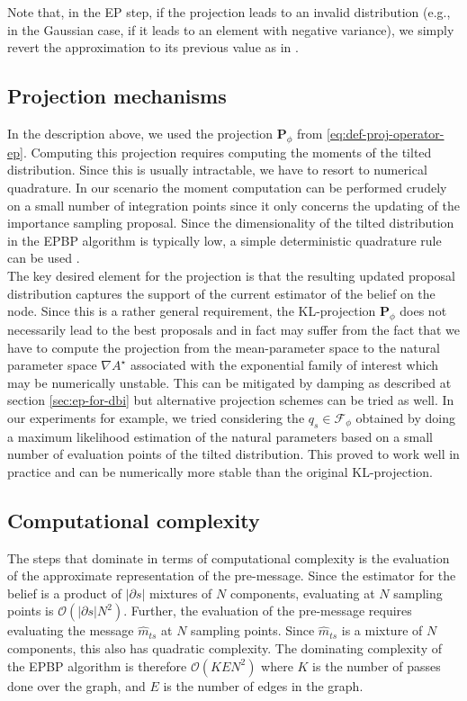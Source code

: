 Note that, in the EP step, if the projection leads to an invalid distribution (e.g., in the Gaussian case, if it leads to an element with negative variance), we simply revert the approximation to its previous value as in \citet{minka01}. 

\subsection{\label{point:epbp-proj}Projection mechanisms}

In the description above, we used the projection $\mathbf P_{\phi}$ from \ref{eq:def-proj-operator-ep}. 
Computing this projection requires computing the moments of the tilted distribution. 
Since this is usually intractable, we have to resort to numerical quadrature. 
In our scenario the moment computation can be performed crudely on a small number of integration points since it only concerns the updating of the importance sampling proposal. 
Since the dimensionality of the tilted distribution in the EPBP algorithm is typically low, a simple deterministic quadrature rule can be used \citep{davis75}. \\

The key desired element for the projection is that the resulting updated proposal distribution captures the support of the current estimator of the belief on the node. Since this is a rather general requirement, the KL-projection $\mathbf P_{\phi}$ does not necessarily lead to the best proposals and in fact may suffer from the fact that we have to compute the projection from the mean-parameter space to the natural parameter space $\nabla A^{\star}$ associated with the exponential family of interest which may be numerically unstable.  
This can be mitigated by damping as described at section \ref{sec:ep-for-dbi} but alternative projection schemes can be tried as well.
In our experiments for example, we tried considering the $q_{s}\in\mathcal F_{\phi}$ obtained by doing a maximum likelihood estimation of the natural parameters based on a small number of evaluation points of the tilted distribution. This proved to work well in practice and can be numerically more stable than the original KL-projection.

\subsection{\label{sec:EPBP-compcompl}Computational complexity}
The steps that dominate in terms of computational complexity is the evaluation of the approximate representation of the pre-message.
Since the estimator for the belief is a product of $|\partial s|$ mixtures of $N$ components, evaluating at $N$ sampling points is $\mathcal O(|\partial s|N^{2})$. 
Further, the evaluation of the pre-message requires evaluating the message $\widehat m_{ts}$ at $N$ sampling points. Since $\widehat m_{ts}$ is a mixture of $N$ components, this also has quadratic complexity. The dominating complexity of the EPBP algorithm is therefore $\mathcal O(KEN^{2})$ where $K$ is the number of passes done over the graph, and $E$ is the number of edges in the graph.

